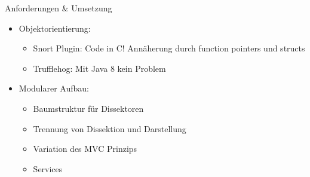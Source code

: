 \begin{frame}{Anforderungen \& Umsetzung}
    \begin{itemize}
        \item Objektorientierung:
        \begin{itemize}
            \item Snort Plugin: Code in C! Annäherung durch function pointers und structs
            \item Trufflehog: Mit Java 8 kein Problem
        \end{itemize}

        \pause
        \item Modularer Aufbau:
        \begin{itemize}
            \item Baumstruktur für Dissektoren
            \item Trennung von Dissektion und Darstellung
            \pause
            \item Variation des MVC Prinzips
            \item Services
        \end{itemize}
    \end{itemize}
\end{frame} 